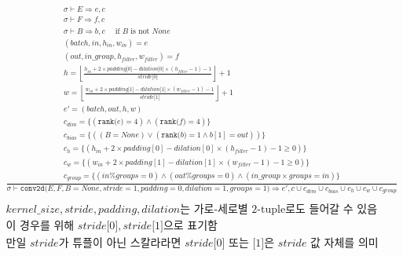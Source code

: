\documentclass{article}
\newcommand{\x}{\times}
\newcommand{\rem}{\mtt{\%}}
\newcommand{\Rar}{\Rightarrow}
\newcommand{\mtt}[1]{\mathtt{#1}}
\newcommand{\bigspace}{\,\,\,\,\,\,\,\,}
\newcommand{\op}[2]{\mtt{#1(}#2\mtt{)}}
\newcommand{\ind}[1]{\mtt{[}#1\mtt{]}}
\begin{document}
\begin{align*}
  \frac
  {
    \begin{array}{l}
      \sigma \vdash E \Rar e, c \\
      \sigma \vdash F \Rar f, c \\
      \sigma \vdash B \Rar b, c \bigspace \text{if $B$ is not $None$} \\
      (batch, in, h_{in}, w_{in}) = e \\
      (out, in\_group, h_{filter}, w_{filter}) = f \\
      h = \left\lfloor \frac{h_{in} + 2 \x padding \ind{0} - dilation \ind{0}
        \x (h_{filter} - 1) - 1}{stride \ind{0}} \right\rfloor + 1 \\
      w = \left\lfloor \frac{w_{in} + 2 \x padding \ind{1} - dilation \ind{1}
        \x (w_{filter} - 1) - 1}{stride \ind{1}} \right\rfloor + 1 \\
      e' = (batch, out, h, w) \\
      c_{dim} = \{ (\op{rank}{e} = 4) \land (\op{rank}{f} = 4) \} \\
      c_{bias} = \{ ((B = None) \lor (\op{rank}{b} = 1 \land b[1] = out)) \} \\
      c_h = \{ (h_{in} + 2 \x padding[0] - dilation[0] \x (h_{filter} - 1) - 1
        \geq 0) \}\\
      c_w = \{ (w_{in} + 2 \x padding[1] - dilation[1] \x (w_{filter} - 1) - 1
        \geq 0) \}\\
      c_{group} = \{ (in \rem groups = 0) \land (out \rem groups = 0)
        \land (in\_group \x groups = in)\}
    \end{array}
  }
  {
    \sigma \vdash \op{conv2d}{E, F, B=None, stride=1, padding=0,
      dilation=1, groups=1} \Rar e', c \cup c_{dim} \cup c_{bias} \cup c_h \cup
      c_w \cup c_{group}
  } \\
  \\
  \text{$kernel\_size, stride, padding, dilation$는 가로-세로별 2-tuple로도 들어갈
  수 있음} \\
  \text{이 경우를 위해 $stride\ind{0}, stride\ind{1}$으로 표기함} \\
  \text{만일 $stride$가 튜플이 아닌 스칼라라면 $stride\ind{0}$ 또는 $\ind{1}$은
    $stride$ 값 자체를 의미}
\end{align*}%
\end{document}
